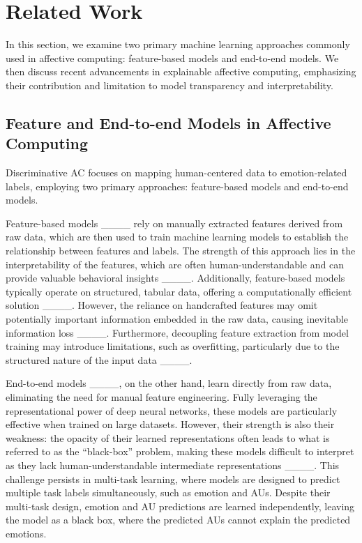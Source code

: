 \section{Related Work}
In this section, we examine two primary machine learning approaches commonly used in affective computing: feature-based models and end-to-end models. We then discuss recent advancements in explainable affective computing, emphasizing their contribution and limitation to model transparency and interpretability.

\subsection{Feature and End-to-end Models in Affective Computing}
    Discriminative AC focuses on mapping human-centered data to emotion-related labels, employing two primary approaches: feature-based models and end-to-end models.
    
    Feature-based models ____ rely on manually extracted features derived from raw data, which are then used to train machine learning models to establish the relationship between features and labels. The strength of this approach lies in the interpretability of the features, which are often human-understandable and can provide valuable behavioral insights ____. Additionally, feature-based models typically operate on structured, tabular data, offering a computationally efficient solution ____. However, the reliance on handcrafted features may omit potentially important information embedded in the raw data, causing inevitable information loss ____. Furthermore, decoupling feature extraction from model training may introduce limitations, such as overfitting, particularly due to the structured nature of the input data ____.
    
    End-to-end models ____, on the other hand, learn directly from raw data, eliminating the need for manual feature engineering. Fully leveraging the representational power of deep neural networks, these models are particularly effective when trained on large datasets. However, their strength is also their weakness: the opacity of their learned representations often leads to what is referred to as the ``black-box'' problem, making these models difficult to interpret as they lack human-understandable intermediate representations ____. 
    This challenge persists in multi-task learning, where models are designed to predict multiple task labels simultaneously, such as emotion and AUs. Despite their multi-task design, emotion and AU predictions are learned independently, leaving the model as a black box, where the predicted AUs cannot explain the predicted emotions.

